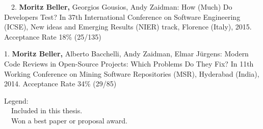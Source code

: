 \begin{etaremune}
{\item[\faFileTextO~~2.] \textbf{Moritz Beller,} Georgios Gousios, Andy Zaidman: How (Much) Do
  Developers Test? In 37th International Conference on Software Engineering (ICSE), New ideas and
  Emerging Results (NIER) track, Florence (Italy), 2015. Acceptance Rate 18\% (25/135)

\item[1.] \textbf{Moritz Beller,} Alberto Bacchelli, Andy Zaidman, Elmar Jürgens:
  Modern Code Reviews in Open-Source Projects: Which Problems Do They Fix? In 11th Working
  Conference on Mining Software Repositories (MSR), Hyderabad (India), 2014. Acceptance Rate 34\% (29/85)

}\end{etaremune}

\vspace{0.5cm}
\noindent
Legend:\\
\faFileTextO~~Included in this thesis.\\
\faTrophy~~Won a best paper or proposal award.
